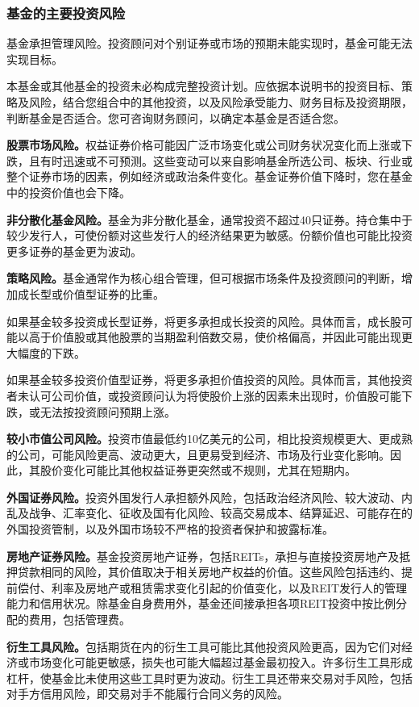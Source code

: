 \documentclass[UTF8,fontset=none,11pt,a4paper]{ctexart}
\begin{document}
\subsubsection*{基金的主要投资风险}
基金承担管理风险。投资顾问对个别证券或市场的预期未能实现时，基金可能无法实现目标。

本基金或其他基金的投资未必构成完整投资计划。应依据本说明书的投资目标、策略及风险，结合您组合中的其他投资，以及风险承受能力、财务目标及投资期限，判断基金是否适合。您可咨询财务顾问，以确定本基金是否适合您。

\textbf{股票市场风险。}权益证券价格可能因广泛市场变化或公司财务状况变化而上涨或下跌，且有时迅速或不可预测。这些变动可以来自影响基金所选公司、板块、行业或整个证券市场的因素，例如经济或政治条件变化。基金证券价值下降时，您在基金中的投资价值也会下降。

\textbf{非分散化基金风险。}基金为非分散化基金，通常投资不超过40只证券。持仓集中于较少发行人，可使份额对这些发行人的经济结果更为敏感。份额价值也可能比投资更多证券的基金更为波动。

\textbf{策略风险。}基金通常作为核心组合管理，但可根据市场条件及投资顾问的判断，增加成长型或价值型证券的比重。

如果基金较多投资成长型证券，将更多承担成长投资的风险。具体而言，成长股可能以高于价值股或其他股票的当期盈利倍数交易，使价格偏高，并因此可能出现更大幅度的下跌。

如果基金较多投资价值型证券，将更多承担价值投资的风险。具体而言，其他投资者未认可公司价值，或投资顾问认为将使股价上涨的因素未出现时，价值股可能下跌，或无法按投资顾问预期上涨。


\par{}\label{originalpage3}
\textbf{较小市值公司风险。}投资市值最低约10亿美元的公司，相比投资规模更大、更成熟的公司，可能风险更高、波动更大，且更易受到经济、市场及行业变化影响。因此，其股价变化可能比其他权益证券更突然或不规则，尤其在短期内。

\textbf{外国证券风险。}投资外国发行人承担额外风险，包括政治经济风险、较大波动、内乱及战争、汇率变化、征收及国有化风险、较高交易成本、结算延迟、可能存在的外国投资管制，以及外国市场较不严格的投资者保护和披露标准。

\textbf{房地产证券风险。}基金投资房地产证券，包括REITs，承担与直接投资房地产及抵押贷款相同的风险，其价值取决于相关房地产权益的价值。这些风险包括违约、提前偿付、利率及房地产或租赁需求变化引起的价值变化，以及REIT发行人的管理能力和信用状况。除基金自身费用外，基金还间接承担各项REIT投资中按比例分配的费用，包括管理费。

\textbf{衍生工具风险。}包括期货在内的衍生工具可能比其他投资风险更高，因为它们对经济或市场变化可能更敏感，损失也可能大幅超过基金最初投入。许多衍生工具形成杠杆，使基金比未使用这些工具时更为波动。衍生工具还带来交易对手风险，包括对手方信用风险，即交易对手不能履行合同义务的风险。
\end{document}
